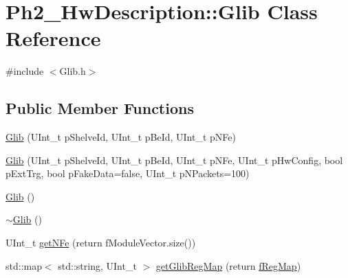 \hypertarget{class_ph2___hw_description_1_1_glib}{\section{Ph2\-\_\-\-Hw\-Description\-:\-:Glib Class Reference}
\label{class_ph2___hw_description_1_1_glib}
}


{\ttfamily \#include $<$Glib.\-h$>$}

\subsection*{Public Member Functions}
\begin{DoxyCompactItemize}
\item 
\hyperlink{class_ph2___hw_description_1_1_glib_a93072e632c80fdf9de212b330d362b4f}{Glib} (U\-Int\-\_\-t p\-Shelve\-Id, U\-Int\-\_\-t p\-Be\-Id, U\-Int\-\_\-t p\-N\-Fe)
\item 
\hyperlink{class_ph2___hw_description_1_1_glib_ab953787a6210cef99c213e1f35cba5e8}{Glib} (U\-Int\-\_\-t p\-Shelve\-Id, U\-Int\-\_\-t p\-Be\-Id, U\-Int\-\_\-t p\-N\-Fe, U\-Int\-\_\-t p\-Hw\-Config, bool p\-Ext\-Trg, bool p\-Fake\-Data=false, U\-Int\-\_\-t p\-N\-Packets=100)
\item 
\hyperlink{class_ph2___hw_description_1_1_glib_a2d9eece9012cdc452f43895852693329}{Glib} ()
\item 
\hyperlink{class_ph2___hw_description_1_1_glib_a2fa668cf8b827199d63be060616a70cd}{$\sim$\-Glib} ()
\item 
U\-Int\-\_\-t \hyperlink{class_ph2___hw_description_1_1_glib_a88b177895e6e649d99301e29fb6b22df}{get\-N\-Fe} (return f\-Module\-Vector.\-size())
\item 
std\-::map$<$ std\-::string, U\-Int\-\_\-t $>$ \hyperlink{class_ph2___hw_description_1_1_glib_a9fba81fb37efb0421c9bf565691f30b2}{get\-Glib\-Reg\-Map} (return \hyperlink{class_ph2___hw_description_1_1_glib_a1a0c6dba5a24c615e8609b03012a8970}{f\-Reg\-Map})
\end{DoxyCompactItemize}

